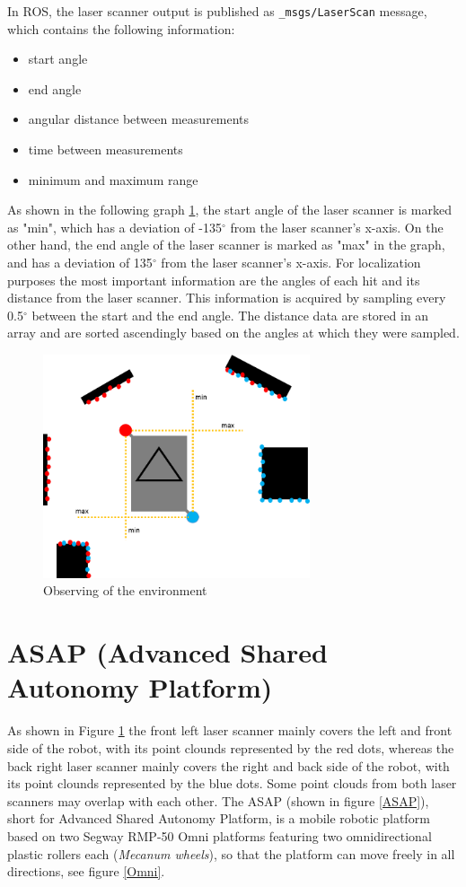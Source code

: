 In ROS, the laser scanner output is published as \texttt{\_msgs/LaserScan} message, which contains the following information:
\begin{itemize}
\item start angle
\item end angle
\item angular distance between measurements
\item time between measurements
\item minimum and maximum range
\end{itemize}

As shown in the following graph \ref{sensor}, the start angle of the laser scanner is marked as "min", which has a deviation of -135$^{\circ}$ from the laser scanner's x-axis. On the other hand, the end angle of the laser scanner is marked as "max" in the graph, and has a deviation of 135$^{\circ}$ from the laser scanner's x-axis. For localization purposes the most important information are the angles of each hit and its distance from the laser scanner. This information is acquired by sampling every 0.5$^{\circ}$ between the start and the end angle. The distance data are stored in an array and are sorted ascendingly based on the angles at which they were sampled.

\begin{figure}[htb]
      \centering
      \includegraphics[width=0.7\textwidth]{graphics/sensoren.png}
      \caption{Observing of the environment}
      \label{sensor}
      \centering
\end{figure}



\section{ASAP (Advanced Shared Autonomy Platform)}
As shown in Figure \ref{sensor} the front left laser scanner mainly covers the left and front side of the robot, with its point clounds represented by the red dots, whereas the back right laser scanner mainly covers the right and back side of the robot, with its point clounds represented by the blue dots. Some point clouds from both laser scanners may overlap with each other. 
The ASAP (shown in figure \ref{ASAP}), short for Advanced Shared Autonomy Platform, is a mobile robotic platform based on two Segway RMP-50 Omni platforms featuring two omnidirectional plastic rollers each (\textit{Mecanum wheels}), so that the platform can move freely in all directions, see figure \ref{Omni}.

